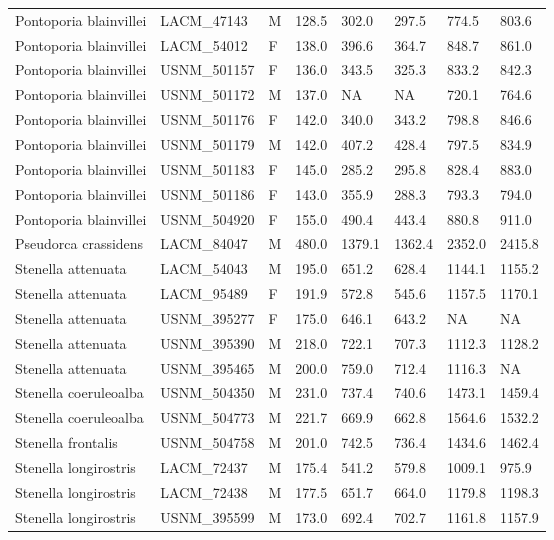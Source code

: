 \begin{longtable}{|p{1.95in}p{1.1in}p{.15in}p{.4in}p{.4in}p{.4in}p{.4in}p{.4in}|}
  Pontoporia blainvillei & LACM\_47143 & M & 128.5 & 302.0 & 297.5 & 774.5 & 803.6 \\ 
  Pontoporia blainvillei & LACM\_54012 & F & 138.0 & 396.6 & 364.7 & 848.7 & 861.0 \\ 
  Pontoporia blainvillei & USNM\_501157 & F & 136.0 & 343.5 & 325.3 & 833.2 & 842.3 \\ 
  Pontoporia blainvillei & USNM\_501172 & M & 137.0 & NA & NA & 720.1 & 764.6 \\ 
  Pontoporia blainvillei & USNM\_501176 & F & 142.0 & 340.0 & 343.2 & 798.8 & 846.6 \\ 
  Pontoporia blainvillei & USNM\_501179 & M & 142.0 & 407.2 & 428.4 & 797.5 & 834.9 \\ 
  Pontoporia blainvillei & USNM\_501183 & F & 145.0 & 285.2 & 295.8 & 828.4 & 883.0 \\ 
  Pontoporia blainvillei & USNM\_501186 & F & 143.0 & 355.9 & 288.3 & 793.3 & 794.0 \\ 
  Pontoporia blainvillei & USNM\_504920 & F & 155.0 & 490.4 & 443.4 & 880.8 & 911.0 \\ 
  Pseudorca crassidens & LACM\_84047 & M & 480.0 & 1379.1 & 1362.4 & 2352.0 & 2415.8 \\ 
  Stenella attenuata & LACM\_54043 & M & 195.0 & 651.2 & 628.4 & 1144.1 & 1155.2 \\ 
  Stenella attenuata & LACM\_95489 & F & 191.9 & 572.8 & 545.6 & 1157.5 & 1170.1 \\ 
  Stenella attenuata & USNM\_395277 & F & 175.0 & 646.1 & 643.2 & NA & NA  \\ 
  Stenella attenuata & USNM\_395390 & M & 218.0 & 722.1 & 707.3 & 1112.3 & 1128.2 \\ 
  Stenella attenuata & USNM\_395465 & M & 200.0 & 759.0 & 712.4 & 1116.3 & NA  \\ 
  Stenella coeruleoalba & USNM\_504350 & M & 231.0 & 737.4 & 740.6 & 1473.1 & 1459.4 \\ 
  Stenella coeruleoalba & USNM\_504773 & M & 221.7 & 669.9 & 662.8 & 1564.6 & 1532.2 \\ 
  Stenella frontalis & USNM\_504758 & M & 201.0 & 742.5 & 736.4 & 1434.6 & 1462.4 \\ 
  Stenella longirostris & LACM\_72437 & M & 175.4 & 541.2 & 579.8 & 1009.1 & 975.9 \\ 
  Stenella longirostris & LACM\_72438 & M & 177.5 & 651.7 & 664.0 & 1179.8 & 1198.3 \\ 
  Stenella longirostris & USNM\_395599 & M & 173.0 & 692.4 & 702.7 & 1161.8 & 1157.9 \\ 

\end{longtable}
